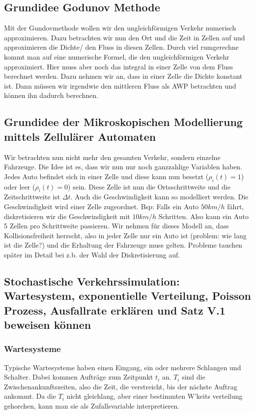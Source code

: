 \documentclass[]{article}
\begin{document}
\subsection*{Grundidee Godunov Methode}
Mit der Gundovmethode wollen wir den ungleichförmigen Verkehr numerisch approximieren. 
Dazu betrachten wir nun den Ort und die Zeit in Zellen auf und approximieren die Dichte/ den Fluss in diesen Zellen. Durch viel rumgerechne kommt man auf eine numerische Formel, die den ungleichförmigen Verkehr approximiert. Hier muss aber noch das integral in einer Zelle von dem Fluss berechnet werden. Dazu nehmen wir an, dass in einer Zelle die Dichte konstant ist. Dann müssen wir irgendwie den mittleren Fluss als AWP betrachten und können ihn dadurch berechnen.   

\subsection*{Grundidee der Mikroskopischen Modellierung mittels Zellulärer Automaten}
Wir betrachten nun nicht mehr den gesamten Verkehr, sondern einzelne Fahrzeuge. Die Idee ist es, dass wir nun nur noch ganzzahlige Variablen haben. Jedes Auto befindet sich in einer Zelle und diese kann nun besetzt ($\rho_i(t)=1$) oder leer ($\rho_i(t)=0$) sein. Diese Zelle ist nun die Ortsschrittweite und die Zeitschrittweite ist $\Delta t$. Auch die Geschwindigkeit kann so modelliert werden. Die Geschwindigkeit wird einer Zelle zugeordnet. Bsp: Falls ein Auto $50 km/h$ fährt, diskretisieren wir die Geschwindigkeit mit $10 km/h$ Schritten. Also kann ein Auto 5 Zellen pro Schrittweite passieren.
Wir nehmen für dieses Modell an, dass Kollisionsfreiheit herrscht, also in jeder Zelle nur ein Auto ist (problem: wie lang ist die Zelle?) und die Erhaltung der Fahrzeuge muss gelten.    
Probleme tauchen später im Detail bei z.b. der Wahl der Diskretisierung auf.

\subsection*{Stochastische Verkehrssimulation: Wartesystem, exponentielle Verteilung, Poisson Prozess, Ausfallrate erklären und Satz V.1 beweisen können}
\subsubsection*{Wartesysteme}
Typische Wartesysteme haben einen Eingang, ein oder mehrere Schlangen und Schalter. Dabei kommen Aufträge zum Zeitpunkt $t_i$ an. $T_i$ sind die Zwischenankunftszeiten, also die Zeit, die verstreicht, bis der nächste Auftrag ankommt. Da die $T_i$ nicht gleichlang, aber einer bestimmten W'keits verteilung gehorchen, kann man sie als Zufallsvariable interpretieren. 
\end{document}
